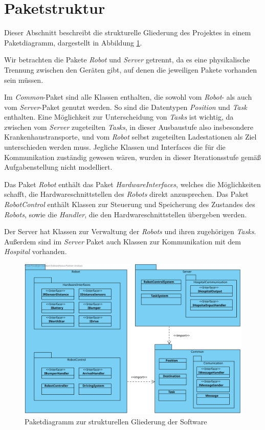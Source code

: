 \section{Paketstruktur}
Dieser Abschnitt beschreibt die strukturelle Gliederung des Projektes in einem Paketdiagramm, dargestellt in Abbildung \ref{Paketstruktur}.

Wir betrachten die Pakete \textit{Robot} und \textit{Server} getrennt, da es eine physikalische Trennung zwischen den Geräten gibt, auf denen die jeweiligen Pakete vorhanden sein müssen.

Im \textit{Common}-Paket sind alle Klassen enthalten, die sowohl vom \textit{Robot}- als auch vom \textit{Server}-Paket genutzt werden. 
So sind die Datentypen \textit{Position} und \textit{Task} enthalten. 
Eine Möglichkeit zur Unterscheidung von \textit{Tasks} ist wichtig, da zwischen vom \textit{Server} zugeteilten \textit{Tasks}, in dieser Ausbaustufe also insbesondere Krankenhaustransporte, und vom \textit{Robot} selbst zugeteilten Ladestationen als Ziel unterschieden werden muss. 
Jegliche Klassen und Interfaces die für die Kommunikation zuständig gewesen wären, wurden in dieser Iterationsstufe gemäß Aufgabenstellung nicht modelliert.

Das Paket \textit{Robot} enthält das Paket \textit{HardwareInterfaces}, welches die Möglichkeiten schafft, die Hardwareschnittstellen des \textit{Robots} direkt anzusprechen. 
Das Paket \textit{RobotControl} enthält Klassen zur Steuerung und Speicherung des Zustandes des \textit{Robots}, sowie die \emph{Handler}, die den Hardwareschnittstellen übergeben werden.

Der Server hat Klassen zur Verwaltung der \textit{Robots} und ihren zugehörigen \textit{Tasks}. 
Außerdem sind im \textit{Server} Paket auch Klassen zur Kommunikation mit dem \textit{Hospital} vorhanden.

\begin{figure}[H]
\centering
\includegraphics[height=1\textwidth, angle=90]{img/6_paketdiagramm}
\caption{Paketdiagramm zur strukturellen Gliederung der Software}
\label{Paketstruktur}
\end{figure}
